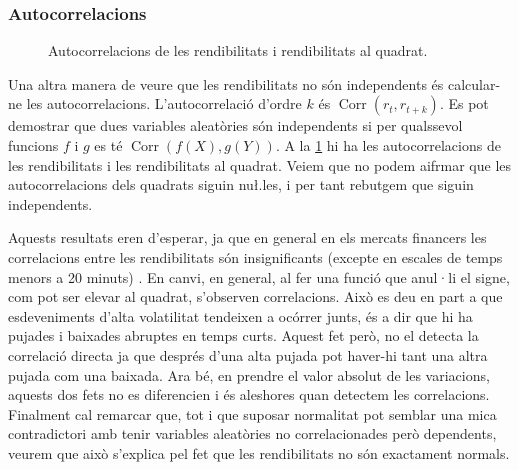\documentclass{article}
\numberwithin{table}{section}
\numberwithin{figure}{section}
\numberwithin{equation}{section}
\DeclareMathOperator{\Corr}{Corr}
\begin{document}
\subsubsection{Autocorrelacions}
\begin{figure}[htb]
	\centering \sffamily \small
	
  \caption{Autocorrelacions de les rendibilitats i rendibilitats al quadrat.}
	\label{fig:autocorr}
\end{figure}
Una altra manera de veure que les rendibilitats no són independents és calcular-ne les autocorrelacions. L'autocorrelació d'ordre \( k \) és \( \Corr(r_t, r_{t+k}) \). Es pot demostrar que dues variables aleatòries són independents si per qualssevol funcions \( f \) i \( g \) es té \( \Corr(f(X), g(Y)) \). A la \cref{fig:autocorr} hi ha les autocorrelacions de les rendibilitats i les rendibilitats al quadrat. Veiem que no podem aifrmar que les autocorrelacions dels quadrats siguin nu\l.les, i per tant rebutgem que siguin independents. 

Aquests resultats eren d'esperar, ja que en general en els mercats financers les correlacions entre les rendibilitats són insignificants (excepte en escales de temps menors a 20 minuts) \cite{20}.
En canvi, en general, al fer una funció que anul·li el signe, com pot ser elevar al quadrat, s’observen correlacions. Això es deu en part a que esdeveniments d’alta volatilitat tendeixen a ocórrer junts, és a dir que hi ha pujades i baixades abruptes en temps curts. Aquest fet però, no el detecta la correlació directa ja que després d’una alta pujada pot haver-hi tant una altra pujada com una baixada. Ara bé, en prendre el valor absolut de les variacions, aquests dos fets no es diferencien i és aleshores quan detectem les correlacions.
Finalment cal remarcar que, tot i que suposar normalitat pot semblar una mica contradictori amb tenir variables aleatòries no correlacionades però dependents, veurem que això s’explica pel fet que les rendibilitats no són exactament normals.
\end{document}
